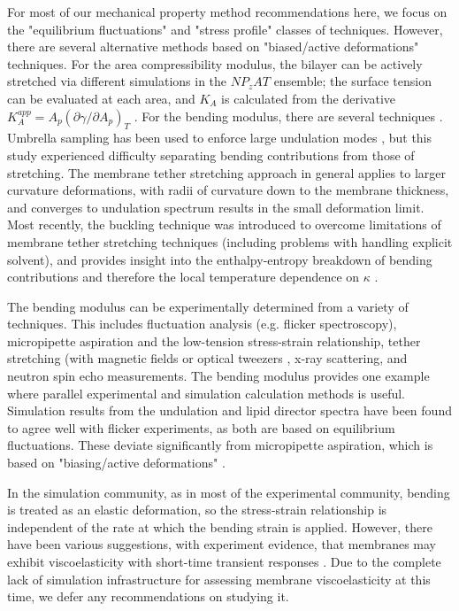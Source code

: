 \documentclass[9pt,bestpractices]{livecoms}
\begin{document}
\begin{table}[t]
\begin{tabularx}{\linewidth}{| X | p{3.25in} | p{2.25in} |}
\hline
\end{tabularx}
\end{table}

For most of our mechanical property method recommendations here, we focus on the "equilibrium fluctuations" and "stress profile" classes of techniques.
However, there are several alternative methods based on "biased/active deformations" techniques.
For the area compressibility modulus, the bilayer can be actively stretched via different simulations in the $NP_zAT$ ensemble; the surface tension can be evaluated at each area, and $K_A$ is calculated from the derivative $K_A^{app} = A_p(\partial \gamma / \partial A_p)_T$ \cite{Feller1995,Zhang1995}.
For the bending modulus, there are several techniques \cite{Diggins2013,Shiba2011,Harmandaris2006a,DenOtter2003}.
Umbrella sampling has been used to enforce large undulation modes \cite{DenOtter2003}, but this study experienced difficulty separating bending contributions from those of stretching.
The membrane tether stretching approach in general applies to larger curvature deformations, with radii of curvature down to the membrane thickness, and converges to undulation spectrum results in the small deformation limit.
Most recently, the buckling technique was introduced to overcome limitations of membrane tether stretching techniques (including problems with handling explicit solvent), and provides insight into the enthalpy-entropy breakdown of bending contributions and therefore the local temperature dependence on $\kappa$ \cite{Diggins2013,Shiba2011}.

The bending modulus can be experimentally determined from a variety of techniques.
This includes fluctuation analysis (e.g. flicker spectroscopy), micropipette aspiration and the low-tension stress-strain relationship, tether stretching (with magnetic fields or optical tweezers \cite{Pontes2017,Wu2015c}, x-ray scattering, and neutron spin echo measurements.
The bending modulus provides one example where parallel experimental and simulation calculation methods is useful. Simulation results from the undulation and lipid director spectra have been found to agree well with flicker experiments, as both are based on equilibrium fluctuations.
These deviate significantly from micropipette aspiration, which is based on "biasing/active deformations" \cite{Venable2015}.

In the simulation community, as in most of the experimental community, bending is treated as an elastic deformation, so the stress-strain relationship is independent of the rate at which the bending strain is applied.
However, there have been various suggestions, with experiment evidence, that membranes may exhibit viscoelasticity with short-time transient responses \cite{Brown2011a,Wu2015c}.
Due to the complete lack of simulation infrastructure for assessing membrane viscoelasticity at this time, we defer any recommendations on studying it.
\end{document}
